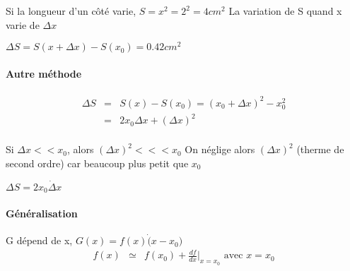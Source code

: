 Si la longueur d'un côté varie, $S = x^2 = 2^2 = 4cm^2$
La variation de S quand x varie de $\Delta x$

$\Delta S = S(x+\Delta x) - S(x_0) = 0.42 cm^2$

\paragraph{Autre méthode}
\begin{align*}
	\Delta S & = & S(x) - S(x_0) = (x_0 + \Delta x)^2 - x_0^2 \\
						 & = & 2x_0 \Delta x + (\Delta x)^2 \\
\end{align*}

Si $\Delta x << x_0$, alors $(\Delta x)^2 <<< x_0$ On néglige alors $(\Delta x)^2$ (therme de second ordre) car beaucoup plus petit que $x_0$

$\Delta S = 2x_0 \dot \Delta x$
\paragraph{Généralisation} G dépend de x, $G(x) = f(x) \dot (x-x_0)$
\begin{align*}
	f(x) & \simeq & f(x_0) + \frac{df}{dx}|_{x=x_0} \text{ avec } x = x_0
\end{align*}
